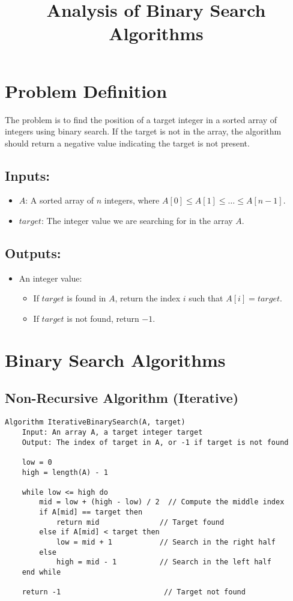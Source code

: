 \documentclass{article}
\title{Analysis of Binary Search Algorithms}
\author{}
\date{}
\begin{document}
\maketitle

\section{Problem Definition}

The problem is to find the position of a target integer in a sorted array of integers using binary search. If the target is not in the array, the algorithm should return a negative value indicating the target is not present.

\subsection*{Inputs:}
\begin{itemize}
  \item $A$: A sorted array of $n$ integers, where $A[0] \leq A[1] \leq \dots \leq A[n-1]$.
  \item $target$: The integer value we are searching for in the array $A$.
\end{itemize}

\subsection*{Outputs:}
\begin{itemize}
  \item An integer value:
  \begin{itemize}
    \item If $target$ is found in $A$, return the index $i$ such that $A[i] = target$.
    \item If $target$ is not found, return $-1$.
  \end{itemize}
\end{itemize}

\section{Binary Search Algorithms}

\subsection{Non-Recursive Algorithm (Iterative)\cite{chatgpt2023}}
\begin{verbatim}
Algorithm IterativeBinarySearch(A, target)
    Input: An array A, a target integer target
    Output: The index of target in A, or -1 if target is not found

    low = 0
    high = length(A) - 1

    while low <= high do
        mid = low + (high - low) / 2  // Compute the middle index
        if A[mid] == target then
            return mid              // Target found
        else if A[mid] < target then
            low = mid + 1           // Search in the right half
        else
            high = mid - 1          // Search in the left half
    end while

    return -1                        // Target not found
\end{verbatim}
\end{document}
